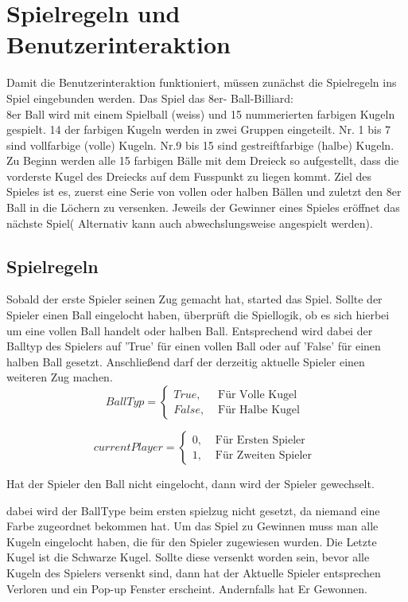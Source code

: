 \section{Spielregeln und Benutzerinteraktion}
Damit die Benutzerinteraktion funktioniert, müssen zunächst die Spielregeln ins Spiel eingebunden werden. Das Spiel das 8er- Ball-Billiard: \\
 8er Ball wird mit einem Spielball (weiss) und 15 nummerierten farbigen Kugeln gespielt. 14 der farbigen Kugeln werden in zwei Gruppen eingeteilt. Nr. 1 bis 7 sind vollfarbige (volle) Kugeln. Nr.9 bis 15 sind gestreiftfarbige (halbe) Kugeln. Zu Beginn werden alle 15 farbigen Bälle mit dem Dreieck so aufgestellt, dass die vorderste Kugel des Dreiecks auf dem Fusspunkt zu liegen kommt. Ziel des Spieles ist es, zuerst eine Serie von vollen oder halben Bällen und zuletzt den 8er Ball in die Löchern zu versenken. Jeweils der Gewinner eines Spieles eröffnet das nächste Spiel( Alternativ kann auch abwechslungsweise angespielt werden).

\subsection{Spielregeln}
Sobald der erste Spieler seinen Zug gemacht hat, started das Spiel.
Sollte der Spieler einen Ball eingelocht haben, überprüft die Spiellogik, ob es sich hierbei um eine vollen Ball handelt oder halben Ball. Entsprechend wird dabei der Balltyp des Spielers auf 'True' für einen vollen Ball oder auf 'False' für einen halben Ball gesetzt. Anschließend darf der derzeitig aktuelle Spieler einen weiteren Zug machen. \begin{equation}
BallTyp = \begin{cases}
True, & \text{ Für Volle Kugel } \\
False, & \text{ Für Halbe Kugel }
\end{cases}
\end{equation}

\begin{equation}
currentPlayer = \begin{cases}
0, & \text{ Für Ersten Spieler } \\
1, & \text{ Für Zweiten Spieler }
\end{cases}
\end{equation}

Hat der Spieler den Ball nicht eingelocht, dann wird der Spieler gewechselt.

dabei wird der BallType beim ersten spielzug nicht gesetzt, da niemand eine Farbe zugeordnet bekommen hat.
Um das Spiel zu Gewinnen muss man alle Kugeln eingelocht haben, die für den Spieler zugewiesen wurden. Die Letzte Kugel ist die Schwarze Kugel. Sollte diese versenkt worden sein, bevor alle Kugeln des Spielers versenkt sind, dann hat der Aktuelle Spieler entsprechen Verloren und ein Pop-up Fenster erscheint. Andernfalls hat Er  Gewonnen.

